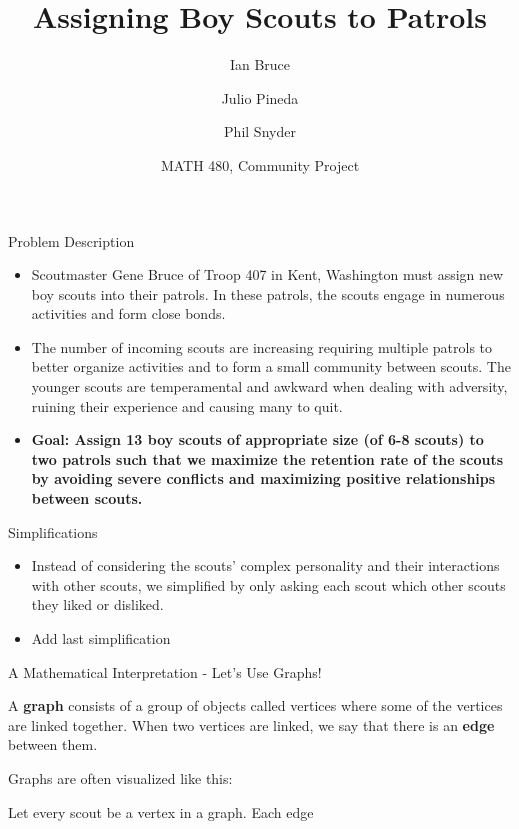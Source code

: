 \documentclass{beamer}
\title{Assigning Boy Scouts to Patrols}
\author{Ian Bruce \and Julio Pineda \and Phil Snyder}
\date{MATH 480, Community Project}
\begin{document}
\begin{frame}
  \titlepage
\end{frame}

\begin{frame}{Problem Description}%
	\begin{itemize}
		\item Scoutmaster Gene Bruce of Troop 407 in Kent, Washington must assign new boy scouts into their patrols. In these patrols, the scouts engage in numerous activities and form close bonds. \\
		\vspace{0.2in}
		\item The number of incoming scouts are increasing requiring multiple patrols to better organize activities and to form a small community between scouts.
		The younger scouts are temperamental and awkward when dealing with adversity, ruining their experience and causing many to quit. \\
		\vspace{0.2in}
		\item \textbf{Goal:  Assign 13 boy scouts of appropriate size (of 6-8 scouts) to two patrols such that we maximize the retention rate of the scouts by avoiding severe conflicts and maximizing positive relationships between scouts.}
	\end{itemize}
\end{frame}

\begin{frame}{Simplifications}
	\begin{itemize}
		\item Instead of considering the scouts' complex personality and their interactions with other scouts, we simplified by only asking each scout which other scouts they liked or disliked.
		
		\item Add last simplification
	\end{itemize}
\end{frame}

\begin{frame}{A Mathematical Interpretation - Let's Use Graphs!}
\begin{definition}
A \textbf{graph} consists of a group of objects called vertices where some of the vertices are linked together. When two vertices are linked, we say that there is an \textbf{edge} between them. 
\end{definition}
Graphs are often visualized like this: 

Let every scout be a vertex in a graph. Each edge 
\end{frame}
\end{document}
